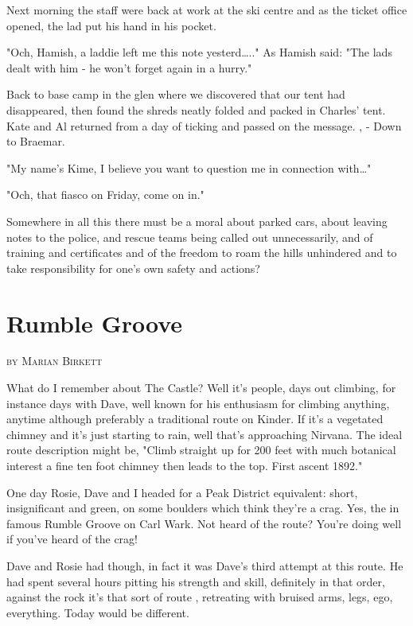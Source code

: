 \documentclass[a5paper,openany,font 10pt]{scrbook}
\makeatletter
\newcommand{\chapterauthor}[1]{%
{\parindent0pt\vspace*{-5pt}%
\linespread{1.1}\large\scshape#1%
\par\nobreak\vspace*{35pt}}
\@afterheading%
}
\makeatother
\begin{document}
Next morning the staff were back  at work at the ski centre
and as the ticket office opened, the lad put his hand in his
pocket.

"Och, Hamish, a laddie left me this note yesterd\ldots{}.." As
Hamish said: "The lads dealt with him - he won't forget again in
a hurry."

Back to base camp in the glen where we discovered that our
tent had disappeared, then found the shreds neatly folded and
packed in Charles' tent. Kate and Al returned from a day of
ticking and passed on the message.  ,   -  Down to Braemar.

"My name's Kime, I believe you want to question me in
connection with\ldots{}"

"Och, that fiasco on Friday, come on in."

Somewhere in all this there must be a moral   about parked
cars, about leaving  notes to the  police, and rescue teams being
called out unnecessarily, and of training and certificates  and
of the freedom to roam the hills unhindered and to  take
responsibility for one's own safety and actions?

\chapter{Rumble Groove}
\label{sec:org95c0f35}
\chapterauthor{by Marian Birkett}

What do I remember about The Castle? Well it's people, days
out climbing, for instance days with Dave, well known for his
enthusiasm for climbing anything, anytime   although preferably a
traditional route on Kinder. If it's a vegetated chimney and it's
just starting to rain, well that's approaching Nirvana. The ideal
route description might be, "Climb straight up for 200 feet with
much botanical interest  a fine ten foot chimney then leads to
the top. First ascent 1892."

One day Rosie, Dave and I headed for a Peak District
equivalent: short, insignificant and green, on some boulders
which think they're a crag. Yes, the  in famous  Rumble Groove  on
Carl Wark. Not heard of the route? You're doing well if you've
heard of the crag!

Dave and Rosie had though, in fact it was Dave's third
attempt at this route. He had spent several hours pitting his
strength and skill, definitely in that order, against the rock
 it's that sort of route , retreating with bruised arms, legs,
ego, everything. Today would be different.
\end{document}
